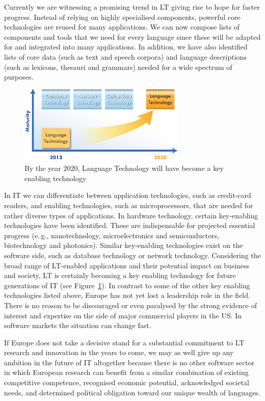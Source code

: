 \documentclass[10pt, plain]{../../metanetpaper}
\begin{document}
\begin{multicols}{2}
Currently we are witnessing a promising trend in LT giving rise to hope for faster progress. Instead of relying on highly specialised components, powerful core technologies are reused for many applications. We can now compose lists of components and tools that we need for every language since these will be adapted for and integrated into many applications. In addition, we have also identified lists of core data (such as text and speech corpora) and language descriptions (such as lexicons, thesauri and grammars) needed for a wide spectrum of purposes.

\begin{figure}[htb]
  \center
  \includegraphics[width=0.71\textwidth]{../_media/LT-maturity}
  \caption{By the year 2020, Language Technology will have become a key enabling technology}
  \label{fig:lt-in-2020}
\end{figure}

In IT we can differentiate between application technologies, such as credit-card readers, and enabling technologies, such as microprocessors, that are needed for rather diverse types of applications. In hardware technology, certain key-enabling technologies have been identified. These are indispensable for projected essential progress (e.\,g., nanotechnology, microelectronics and semiconductors, biotechnology and photonics). Similar key-enabling technologies exist on the software side, such as database technology or network technology. Considering the broad range of LT-enabled applications and their potential impact on business and society, LT is certainly becoming a key enabling technology for future generations of IT (see Figure~\ref{fig:lt-in-2020}). In contrast to some of the other key enabling technologies listed above, Europe has not yet lost a leadership role in the field. There is no reason to be discouraged or even paralysed by the strong evidence of interest and expertise on the side of major commercial players in the US. In software markets the situation can change fast.

If Europe does not take a decisive stand for a substantial commitment to LT research and innovation in the years to come, we may as well give up any ambition in the future of IT altogether because there is no other software sector in which European research can benefit from a similar combination of existing competitive competence, recognised economic potential, acknowledged societal needs, and determined political obligation toward our unique wealth of languages.
\end{multicols}
\end{document}
